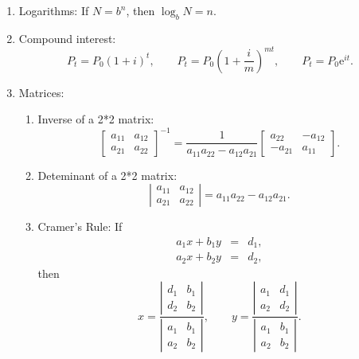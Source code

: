 \begin{enumerate}
	\item Logarithms: If $N=b^{n}$, then $\log _{b}N=n.$
	
	\item Compound interest:%
	\begin{equation*}
	P_{t}=P_{0}\left( 1+i\right) ^{t},\qquad P_{t}=P_{0}\left( 1+\frac{i}{m}%
	\right) ^{mt},\qquad P_{t}=P_{0}\mathrm{e}^{it}.
	\end{equation*}
	
	\item Matrices:
	
	\begin{enumerate}
		\item Inverse of a 2*2 matrix:
		\begin{equation*}
		\left[
		\begin{array}{cc}
		a_{11} & a_{12} \\
		a_{21} & a_{22}%
		\end{array}%
		\right] ^{-1}=\frac{1}{a_{11}a_{22}-a_{12}a_{21}}\left[
		\begin{array}{cc}
		a_{22} & -a_{12} \\
		-a_{21} & a_{11}%
		\end{array}%
		\right] .
		\end{equation*}
		
		\item Deteminant of a 2*2 matrix:
		\begin{equation*}
		\left\vert
		\begin{array}{cc}
		a_{11} & a_{12} \\
		a_{21} & a_{22}%
		\end{array}%
		\right\vert =a_{11}a_{22}-a_{12}a_{21}.
		\end{equation*}
		
		\item Cramer's Rule: If
		\begin{eqnarray*}
			a_{1}x+b_{1}y &=&d_{1}, \\
			a_{2}x+b_{2}y &=&d_{2},
		\end{eqnarray*}%
		then%
		\begin{equation*}
		x=\frac{\left\vert
			\begin{array}{cc}
			d_{1} & b_{1} \\
			d_{2} & b_{2}%
			\end{array}%
			\right\vert }{\left\vert
			\begin{array}{cc}
			a_{1} & b_{1} \\
			a_{2} & b_{2}%
			\end{array}%
			\right\vert },\qquad y=\frac{\left\vert
			\begin{array}{cc}
			a_{1} & d_{1} \\
			a_{2} & d_{2}%
			\end{array}%
			\right\vert }{\left\vert
			\begin{array}{cc}
			a_{1} & b_{1} \\
			a_{2} & b_{2}%
			\end{array}%
			\right\vert }.
		\end{equation*}
	\end{enumerate}
\end{enumerate}

